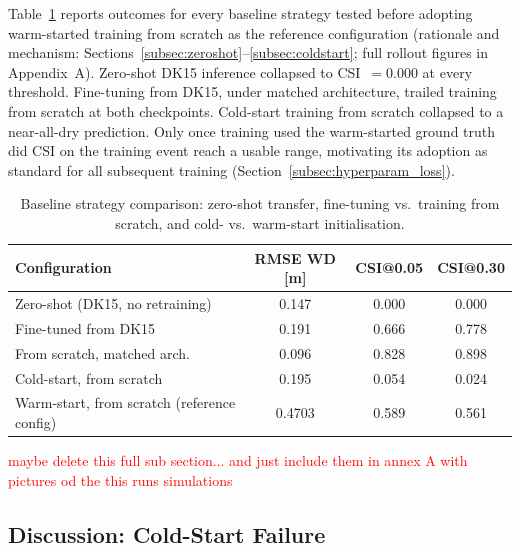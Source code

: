 \documentclass[12pt,a4paper]{report}
\begin{document}
{Table~\ref{tab:baseline-strategies} reports outcomes for every baseline strategy tested
before adopting warm-started training from scratch as the reference configuration
(rationale and mechanism: Sections~\ref{subsec:zeroshot}--\ref{subsec:coldstart}; full
rollout figures in Appendix~A).  Zero-shot DK15 inference collapsed to CSI~$=0.000$ at every threshold.
Fine-tuning from DK15, under matched architecture, trailed training from scratch at
both checkpoints. Cold-start training from scratch collapsed to a near-all-dry
prediction. Only once training used the warm-started ground truth did CSI on the
training event reach a usable range, motivating its adoption as standard for all
subsequent training (Section~\ref{subsec:hyperparam_loss}).
 
\begin{table}[H]
  \centering
  \caption{Baseline strategy comparison: zero-shot transfer, fine-tuning vs.\ training
    from scratch, and cold- vs.\ warm-start initialisation.}
  \label{tab:baseline-strategies}
  \begin{tabular}{lccc}
    \toprule
    Configuration & RMSE WD [m] & CSI@0.05 & CSI@0.30 \\
    \midrule
    Zero-shot (DK15, no retraining)                     & 0.147            & 0.000         & 0.000 \\
    Fine-tuned from DK15              & 0.191  & 0.666  & 0.778  \\
    From scratch, matched arch.\       & 0.096  & 0.828  & 0.898  \\
    Cold-start, from scratch           & 0.195  & 0.054  & 0.024  \\
    Warm-start, from scratch (reference config)          & 0.4703            & 0.589         & 0.561 \\
    \bottomrule
  \end{tabular}
\end{table}
 
 
\textcolor{red}{maybe delete this full sub section... and just include them in annex A with pictures od the this runs simulations}
 
\subsection{Discussion: Cold-Start Failure}
\label{subsec:discussion_coldstart}

}
\end{document}
